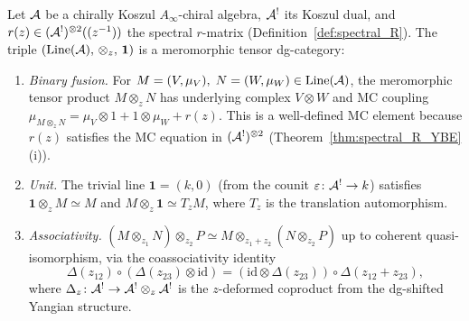 \begin{theorem}
\label{thm:meromorphic-tensor-category}
Let $\mathcal{A}$ be a chirally Koszul $A_\infty$-chiral algebra,
$\mathcal{A}^!$ its Koszul dual, and $r(z) \in (\mathcal{A}^!)^{\otimes 2}((z^{-1}))$
the spectral $r$-matrix
\textup{(}Definition~\textup{\ref{def:spectral_R}}\textup{)}.
The triple
$(\operatorname{Line}(\mathcal{A}),\, \otimes_z,\, \mathbf{1})$
is a meromorphic tensor dg-category:
\begin{enumerate}[label=\textup{(\roman*)}]
\item \emph{Binary fusion.}
 For $M = (V, \mu_V),\; N = (W, \mu_W) \in \operatorname{Line}(\mathcal{A})$,
 the meromorphic tensor product $M \otimes_z N$ has underlying
 complex $V \otimes W$ and MC coupling
 $\mu_{M \otimes_z N} = \mu_V \otimes 1 + 1 \otimes \mu_W
 + r(z)$.
 This is a well-defined MC element because $r(z)$ satisfies the
 MC equation in $(\mathcal{A}^!)^{\otimes 2}$
 \textup{(}Theorem~\textup{\ref{thm:spectral_R_YBE}(i)}\textup{)}.

\item \emph{Unit.}
 The trivial line $\mathbf{1} = (k, 0)$
 \textup{(}from the counit $\varepsilon \colon \mathcal{A}^! \to k$\textup{)}
 satisfies $\mathbf{1} \otimes_z M \simeq M$ and
 $M \otimes_z \mathbf{1} \simeq T_z M$, where $T_z$ is the
 translation automorphism.

\item \emph{Associativity.}
 $(M \otimes_{z_1} N) \otimes_{z_2} P
 \simeq M \otimes_{z_1+z_2} (N \otimes_{z_2} P)$
 up to coherent quasi-isomorphism, via the coassociativity
 identity
 \[
 \Delta(z_{12}) \circ (\Delta(z_{23}) \otimes \mathrm{id})
 = (\mathrm{id} \otimes \Delta(z_{23})) \circ \Delta(z_{12}+z_{23}),
 \]
 where $\Delta_z \colon \mathcal{A}^! \to \mathcal{A}^! \otimes_z \mathcal{A}^!$
 is the $z$-deformed coproduct from the dg-shifted Yangian
 structure.
\end{enumerate}
\end{theorem}

